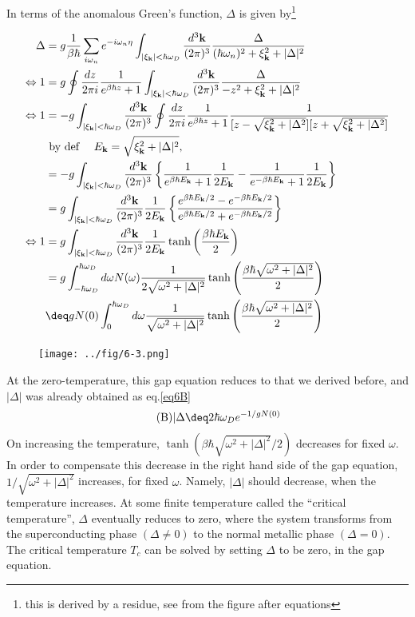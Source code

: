 In terms of the anomalous Green's function, $\Delta$ is given by\footnote{this is derived by a residue, see from the figure after equations}



\[\begin{split}
\Delta &= g\frac{1}{\beta\hbar}\sum_{i\omega_n}e^{-i\omega_n\eta}\int_{|\xi_{\bf k}|<\hbar\omega_D}\frac{d^3\bf k}{(2\pi)^3}\frac{\Delta}{(\hbar\omega_n)^2+\xi_{\bf k}^2+|\Delta|^2}\\
\Leftrightarrow 1&=g\oint \frac{dz}{2\pi i}\frac{1}{e^{\beta\hbar z}+1}\int_{|\xi_{\bf k}|<\hbar\omega_D}\frac{d^3\bf k}{(2\pi)^3}\frac{\Delta}{-z^2+\xi_{\bf k}^2+|\Delta|^2}\\
\Leftrightarrow 1&=-g\int_{|\xi_{\bf k}|<\hbar\omega_D}\frac{d^3\bf k}{(2\pi)^3}\oint \frac{dz}{2\pi i}\frac{1}{e^{\beta\hbar z}+1}\frac{1}{[z-\sqrt{\xi_{\bf k}^2+|\Delta^2}][z+\sqrt{\xi_{\bf k}^2+|\Delta^2}]}\\
&\text{ by def }\quad E_{\bf k} = \sqrt{\xi_{\bf k}^2+|\Delta|^2} ,\\
&=-g\int_{|\xi_{\bf k}|<\hbar\omega_D}\frac{d^3\bf k}{(2\pi)^3}\left\{\frac{1}{e^{\beta\hbar E_{\bf k}}+1}\frac{1}{2E_{\bf k}} - \frac{1}{e^{-\beta\hbar E_{\bf k}}+1}\frac{1}{2E_{\bf k}}\right\}\\
&=g\int_{|\xi_{\bf k}|<\hbar\omega_D}\frac{d^3\bf k}{(2\pi)^3}\frac{1}{2E_{\bf k}}\left\{\frac{e^{\beta\hbar E_{\bf k}/2} - e^{-\beta\hbar E_{\bf k}/2}}{e^{\beta\hbar E_{\bf k}/2} + e^{-\beta\hbar E_{\bf k}/2}}\right\}\\
\Leftrightarrow 1&=g\int_{|\xi_{\bf k}|<\hbar\omega_D}\frac{d^3\bf k}{(2\pi)^3}\frac{1}{2E_{\bf k}}\tanh\left(\frac{\beta\hbar E_{\bf k}}{2}\right)\\
&=g\int_{-\hbar\omega_D}^{\hbar\omega_D} d\omega N(\omega)\frac{1}{2\sqrt{\omega^2+|\Delta|^2}}\tanh\left(\frac{\beta\hbar\sqrt{\omega^2+|\Delta|^2}}{2}\right)\\
&\deq gN(0)\int_0^{\hbar\omega_D}d\omega\frac{1}{\sqrt{\omega^2+|\Delta|^2}}\tanh\left(\frac{\beta\hbar\sqrt{\omega^2+|\Delta|^2}}{2}\right)
\end{split} \]

\begin{wrapfigure}{l}{6cm}
\texttt{[image: ../fig/6-3.png]}\
\end{wrapfigure}

At the zero-temperature, this gap equation reduces to that we derived before, and $|\Delta|$ was already obtained as eq.\eqref{eq6B}
\begin{align}\tag{B}
|\Delta \deq 2\hbar\omega_D e^{-1/gN(0)}
\end{align}
On increasing the temperature, $\tanh({\beta\hbar\sqrt{\omega^2+|\Delta|^2}}/{2})$ decreases for fixed $\omega$. In order to compensate this decrease in the right hand side of the gap equation, $1/\sqrt{\omega^2+|\Delta|^2}$ increases, for fixed $\omega$. Namely, $|\Delta|$ should decrease, when the temperature increases. At some finite temperature called the ``critical temperature'', $\Delta$ eventually reduces to zero, where the system transforms from the superconducting phase $(\Delta\neq0)$ to the normal metallic phase $(\Delta=0)$. The critical temperature $T_c$ can be solved by setting $\Delta$ to be zero, in the gap equation. 

